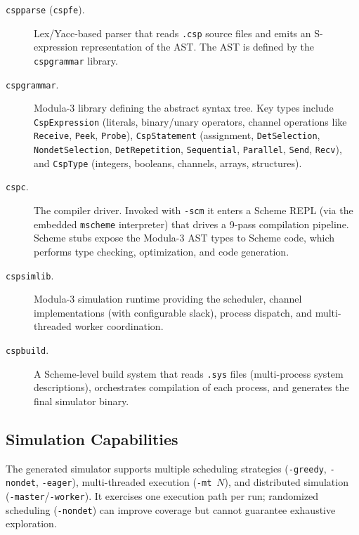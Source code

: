 \documentclass[11pt]{article}
\begin{document}
\begin{description}
\item[\texttt{cspparse} (\texttt{cspfe}).]
  Lex/Yacc-based parser that reads \texttt{.csp} source files and
  emits an S-expression representation of the AST.  The AST is defined
  by the \texttt{cspgrammar} library.

\item[\texttt{cspgrammar}.]
  Modula-3 library defining the abstract syntax tree.  Key types
  include \texttt{CspExpression} (literals, binary/unary operators,
  channel operations like \texttt{Receive}, \texttt{Peek},
  \texttt{Probe}), \texttt{CspStatement} (assignment,
  \texttt{DetSelection}, \texttt{NondetSelection},
  \texttt{DetRepetition}, \texttt{Sequential}, \texttt{Parallel},
  \texttt{Send}, \texttt{Recv}), and \texttt{CspType} (integers,
  booleans, channels, arrays, structures).

\item[\texttt{cspc}.]
  The compiler driver.  Invoked with \texttt{-scm} it enters a Scheme
  REPL (via the embedded \texttt{mscheme} interpreter) that drives a
  9-pass compilation pipeline.  Scheme stubs expose the Modula-3 AST
  types to Scheme code, which performs type checking, optimization,
  and code generation.

\item[\texttt{cspsimlib}.]
  Modula-3 simulation runtime providing the scheduler, channel
  implementations (with configurable slack), process dispatch,
  and multi-threaded worker coordination.

\item[\texttt{cspbuild}.]
  A Scheme-level build system that reads \texttt{.sys} files
  (multi-process system descriptions), orchestrates compilation of
  each process, and generates the final simulator binary.
\end{description}

\subsection{Simulation Capabilities}

The generated simulator supports multiple scheduling strategies
(\texttt{-greedy}, \texttt{-nondet}, \texttt{-eager}), multi-threaded
execution (\texttt{-mt}~$N$), and distributed simulation
(\texttt{-master}/\texttt{-worker}).  It exercises one execution
path per run; randomized scheduling (\texttt{-nondet}) can improve
coverage but cannot guarantee exhaustive exploration.
\end{document}
